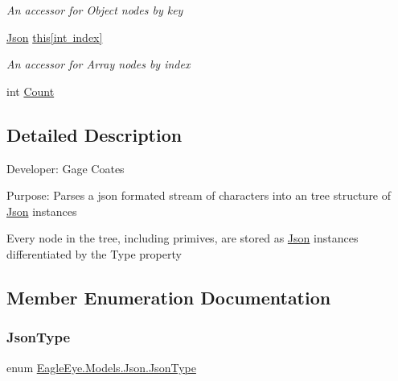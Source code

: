 \begin{DoxyCompactItemize}
\begin{DoxyCompactList}\small\item\em An accessor for Object nodes by key \end{DoxyCompactList}\item 
\mbox{\hyperlink{class_eagle_eye_1_1_models_1_1_json}{Json}} \mbox{\hyperlink{class_eagle_eye_1_1_models_1_1_json_a6a06a70ad6294d135adfa0d66b8b5978}{this\mbox{[}int index\mbox{]}}}
\begin{DoxyCompactList}\small\item\em An accessor for Array nodes by index \end{DoxyCompactList}\item 
int \mbox{\hyperlink{class_eagle_eye_1_1_models_1_1_json_a3f1f39dbe0728fa7591a88435c5ce7b4}{Count}}
\end{DoxyCompactItemize}


\subsection{Detailed Description}
Developer\+: Gage Coates 

Purpose\+: Parses a json formated stream of characters into an tree structure of \mbox{\hyperlink{class_eagle_eye_1_1_models_1_1_json}{Json}} instances

Every node in the tree, including primives, are stored as \mbox{\hyperlink{class_eagle_eye_1_1_models_1_1_json}{Json}} instances differentiated by the Type property 

\subsection{Member Enumeration Documentation}
\mbox{\label{class_eagle_eye_1_1_models_1_1_json_afdf0e16163f8b9bab5b45d6d01e8133c}} 
\subsubsection{\texorpdfstring{JsonType}{JsonType}}
{\footnotesize\ttfamily enum \mbox{\hyperlink{class_eagle_eye_1_1_models_1_1_json_afdf0e16163f8b9bab5b45d6d01e8133c}{Eagle\+Eye.\+Models.\+Json.\+Json\+Type}}\hspace{0.3cm}{\ttfamily [strong]}}



